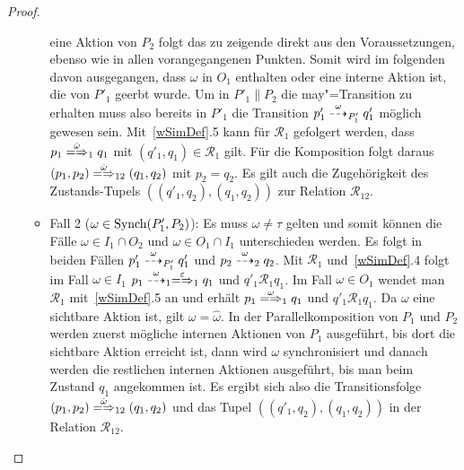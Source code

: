 \begin{proof}
\begin{enumerate}
\begin{itemize}
          eine Aktion von $P_2$ folgt das zu zeigende direkt aus den
          Voraussetzungen, ebenso wie in allen vorangegangenen Punkten. Somit
          wird im folgenden davon ausgegangen, dass $\omega$ in $O_1$ enthalten
          oder eine interne Aktion ist, die von $P'_1$ geerbt wurde. Um in
          $P'_1\|P_2$ die may"=Transition zu erhalten muss also bereits in
          $P'_1$ die Transition $p'_1 \may[\omega]_{P'_1} q'_1$ möglich gewesen
          sein. Mit~\ref{wSimDef}.5 kann für $\mathcal{R}_1$ gefolgert werden,
          dass $p_1 \weakmay[\hat{\omega}]_1 q_1$ mit $(q'_1,q_1) \in
          \mathcal{R}_1$ gilt. Für die Komposition folgt daraus $(p_1,p_2)
          \weakmay[\hat{\omega}]_{12} (q_1,q_2)$ mit $p_2=q_2$. Es gilt auch
          die Zugehörigkeit des Zustands-Tupels $((q'_1,q_2),(q_1,q_2))$ zur
          Relation $\mathcal{R}_{12}$.
        \item Fall 2 ($\omega\in\mathrm{Synch} (P'_1,P_2)$): Es muss $\omega\neq\tau$
          gelten und somit können die Fälle $\omega\in I_1\cap O_2$ und
          $\omega\in O_1\cap I_1$ unterschieden werden. Es folgt in beiden
          Fällen $p'_1\may[\omega]_{P'_1} q'_1$ und $p_2 \may[\omega]_2
          q_2$. Mit $\mathcal{R}_1$ und~\ref{wSimDef}.4 folgt im Fall
          $\omega\in I_1$ $p_1\may[\omega]_1 \weakmay[\varepsilon]_1 q_1$ und
          $q'_1 \mathcal{R}_1 q_1$. Im Fall $\omega\in O_1$ wendet man
          $\mathcal{R}_1$ mit~\ref{wSimDef}.5 an und erhält $p_1
          \weakmay[\omega]_1 q_1$ und $q'_1\mathcal{R}_1 q_1$. Da $\omega$
          eine sichtbare Aktion ist, gilt $\omega =\hat{\omega}$. In der
          Parallelkomposition von $P_1$ und $P_2$ werden zuerst mögliche
          internen Aktionen von $P_1$ ausgeführt, bis dort die sichtbare Aktion
          erreicht ist, dann wird $\omega$ synchronisiert und danach werden die
          restlichen internen Aktionen ausgeführt, bis man beim Zustand
          $q_1$ angekommen ist. Es ergibt sich also die Transitionsfolge
          $(p_1,p_2) \weakmay[\hat{\omega}]_{12} (q_1,q_2)$ und das Tupel
          $((q'_1,q_2),(q_1,q_2))$ in der Relation $\mathcal{R}_{12}$.
      \end{itemize}
  \end{enumerate}
\end{proof}

